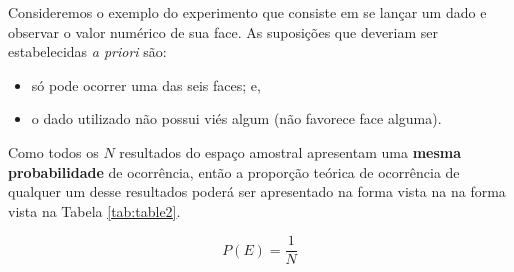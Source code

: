 \documentclass[
]{book}
\providecommand{\tightlist}{%
  \setlength{\itemsep}{0pt}\setlength{\parskip}{0pt}}
\begin{document}
Consideremos o exemplo do experimento que consiste em se lançar um dado e observar o valor numérico de sua face. As suposições que deveriam ser estabelecidas \emph{a priori} são:

\begin{itemize}
\tightlist
\item
  só pode ocorrer uma das seis faces; e,
\item
  o dado utilizado não possui viés algum (não favorece face alguma).
\end{itemize}

Como todos os \(N\) resultados do espaço amostral apresentam uma \textbf{mesma probabilidade} de ocorrência, então a proporção teórica de ocorrência de qualquer um desse resultados poderá ser apresentado na forma vista na na forma vista na Tabela \ref{tab:table2}.

\[
P(E)= \frac{1}{N}
\]\\
\end{document}
